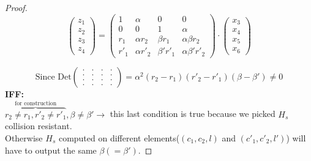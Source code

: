 \begin{proof}
    \[
        \begin{pmatrix}
            z_1\\
            z_2\\
            z_3\\
            z_4
        \end{pmatrix}
        =
        \begin{pmatrix}
            1 & \alpha & 0 & 0 \\
            0 & 0 & 1 & \alpha \\
            r_1 & \alpha r_2 & \beta r_1 & \alpha\beta r_2 \\
            r'_1 & \alpha r'_2 & \beta' r'_1 & \alpha\beta' r'_2
        \end{pmatrix}
        \cdot
        \begin{pmatrix}
            x_3\\
            x_4\\
            x_5\\
            x_6
        \end{pmatrix}
    \]

    \[ \text{Since Det}
    \begin{pmatrix}
        .&.&.&. \\
        .&.&.&.\\
        .&.&.&.\\
        .&.&.&. 
    \end{pmatrix}=
    \alpha^2(r_2-r_1)(r'_2-r'_1)(\beta-\beta')\neq 0
    \]
    \centering\textbf{IFF:}\\
    $\overbrace{r_2\neq r_1 ,r'_2\neq r'_1}^{\text{for construction}},\beta \neq \beta' \rightarrow$ this last condition is true because we picked $H_s$ collision resistant.\\
    Otherwise $H_s$ computed on different elements($(c_1,c_2,l)$ and $(c'_1,c'_2,l')$) will have to output the same $\beta( = \beta')$.
\end{proof}

